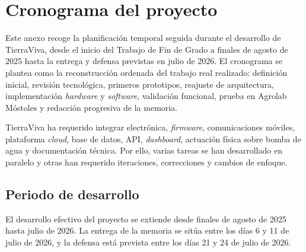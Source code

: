 \chapter{Cronograma del proyecto}
\label{anexo:cronograma}

Este anexo recoge la planificación temporal seguida durante el desarrollo de TierraViva, desde el inicio del Trabajo de Fin de Grado a finales de agosto de 2025 hasta la entrega y defensa previstas en julio de 2026. El cronograma se plantea como la reconstrucción ordenada del trabajo real realizado: definición inicial, revisión tecnológica, primeros prototipos, reajuste de arquitectura, implementación \textit{hardware} y \textit{software}, validación funcional, prueba en Agrolab Móstoles y redacción progresiva de la memoria.

TierraViva ha requerido integrar electrónica, \textit{firmware}, comunicaciones móviles, plataforma \textit{cloud}, base de datos, API, \textit{dashboard}, actuación física sobre bomba de agua y documentación técnica. Por ello, varias tareas se han desarrollado en paralelo y otras han requerido iteraciones, correcciones y cambios de enfoque.

\section{Periodo de desarrollo}

El desarrollo efectivo del proyecto se extiende desde finales de agosto de 2025 hasta julio de 2026. La entrega de la memoria se sitúa entre los días 6 y 11 de julio de 2026, y la defensa está prevista entre los días 21 y 24 de julio de 2026.

\small
\renewcommand{\arraystretch}{1.15}

